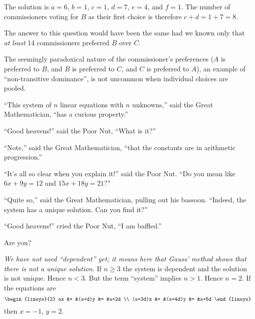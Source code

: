 \begin{exercises}
\begin{answer}
       The solution is $a=6$, $b=1$, $c=1$, $d=7$, $e=4$, and $f=1$.
       The number of commissioners voting for $B$ as their first choice 
       is therefore $c+d=1+7=8$.

       \par{}
       The answer to this question would have been the same had we known only
       that {\em at least\/} 14 commissioners preferred $B$ over $C$.

       The seemingly paradoxical nature of the commissioner's preferences
       ($A$ is preferred to $B$, and $B$ is preferred to $C$, and $C$ is 
       preferred to $A$), an example of ``non-transitive dominance'', is not
       uncommon when individual choices are pooled.
     \end{answer}
  \puzzle \item   
     \cite{Monthly63p93}
    ``This system
     of \( n \) linear equations with
     \( n \) unknowns,'' said the Great Mathematician, ``has a curious
     property.''

     ``Good heavens!'' said the Poor Nut,  ``What is it?''

     ``Note,'' said the Great Mathematician, ``that the constants are in
     arithmetic progression.''

     ``It's all so clear when you explain it!'' said the Poor Nut.
     ``Do you mean like \( 6x+9y=12 \) and \( 15x+18y=21 \)?''

     ``Quite so,'' said the Great Mathematician, pulling out his bassoon.
     ``Indeed, the system has a unique solution.
     Can you find it?''

     ``Good heavens!'' cried the Poor Nut, ``I am baffled.''

     Are you?
     \begin{answer}
       \answerasgiven
       \textit{We have not used ``dependent'' yet; 
       it means here that Gauss'
       method shows that there is not a unique solution.}
       If \( n\geq 3 \) the system is dependent and the solution is not
       unique.
       Hence \( n<3 \).
       But the term ``system'' implies \( n>1 \).
       Hence \( n=2 \).
       If the equations are
       \begin{equation*}
         \begin{linsys}{2}
              ax  &+ &(a+d)y  &=  &a+2d  \\
         (a+3d)x  &+ &(a+4d)y &=  &a+5d  
         \end{linsys}
       \end{equation*}
       then \( x=-1 \), \( y=2 \).  
    \end{answer}
\end{exercises}







